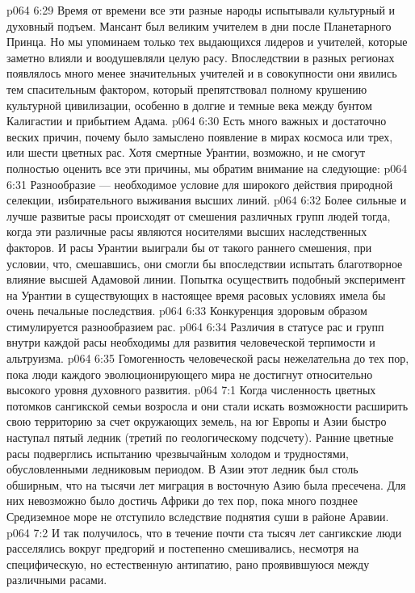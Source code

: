 \vs p064 6:29 \pc Время от времени все эти разные народы испытывали культурный и духовный подъем. Мансант был великим учителем в дни после Планетарного Принца. Но мы упоминаем только тех выдающихся лидеров и учителей, которые заметно влияли и воодушевляли целую расу. Впоследствии в разных регионах появлялось много менее значительных учителей и в совокупности они явились тем спасительным фактором, который препятствовал полному крушению культурной цивилизации, особенно в долгие и темные века между бунтом Калигастии и прибытием Адама.
\vs p064 6:30 \pc Есть много важных и достаточно веских причин, почему было замыслено появление в мирах космоса или трех, или шести цветных рас. Хотя смертные Урантии, возможно, и не смогут полностью оценить все эти причины, мы обратим внимание на следующие:
\vs p064 6:31 \bibnobreakspace Разнообразие --- необходимое условие для широкого действия природной селекции, избирательного выживания высших линий.
\vs p064 6:32 \bibnobreakspace Более сильные и лучше развитые расы происходят от смешения различных групп людей тогда, когда эти различные расы являются носителями высших наследственных факторов. И расы Урантии выиграли бы от такого раннего смешения, при условии, что, смешавшись, они смогли бы впоследствии испытать благотворное влияние высшей Адамовой линии. Попытка осуществить подобный эксперимент на Урантии в существующих в настоящее время расовых условиях имела бы очень печальные последствия.
\vs p064 6:33 \bibnobreakspace Конкуренция здоровым образом стимулируется разнообразием рас.
\vs p064 6:34 \bibnobreakspace Различия в статусе рас и групп внутри каждой расы необходимы для развития человеческой терпимости и альтруизма.
\vs p064 6:35 \bibnobreakspace Гомогенность человеческой расы нежелательна до тех пор, пока люди каждого эволюционирующего мира не достигнут относительно высокого уровня духовного развития.
\vs p064 7:1 Когда численность цветных потомков сангикской семьи возросла и они стали искать возможности расширить свою территорию за счет окружающих земель, на юг Европы и Азии быстро наступал пятый ледник (третий по геологическому подсчету). Ранние цветные расы подверглись испытанию чрезвычайным холодом и трудностями, обусловленными ледниковым периодом. В Азии этот ледник был столь обширным, что на тысячи лет миграция в восточную Азию была пресечена. Для них невозможно было достичь Африки до тех пор, пока много позднее Средиземное море не отступило вследствие поднятия суши в районе Аравии.
\vs p064 7:2 И так получилось, что в течение почти ста тысяч лет сангикские люди расселялись вокруг предгорий и постепенно смешивались, несмотря на специфическую, но естественную антипатию, рано проявившуюся между различными расами.

